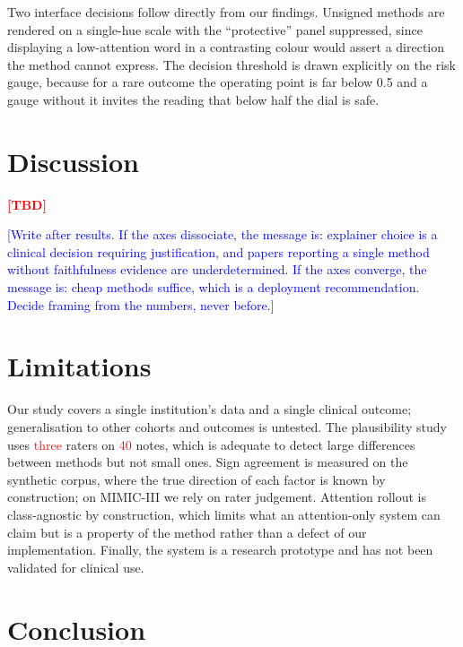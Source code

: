 \documentclass[conference]{IEEEtran}
\newif\ifdraftnums\draftnumstrue   %
\newcommand{\TBD}{\ifdraftnums\textcolor{red}{\textbf{[TBD]}}\else--\fi}
\newcommand{\ph}[1]{\ifdraftnums\textcolor{red}{#1}\else#1\fi}
\newcommand{\note}[1]{\ifdraftnums\textcolor{blue}{\small[#1]}\fi}
\begin{document}
Two interface decisions follow directly from our findings. Unsigned methods are
rendered on a single-hue scale with the ``protective'' panel suppressed, since
displaying a low-attention word in a contrasting colour would assert a direction
the method cannot express. The decision threshold is drawn explicitly on the risk
gauge, because for a rare outcome the operating point is far below 0.5 and a
gauge without it invites the reading that below half the dial is safe.

\section{Discussion}

\TBD

\note{Write after results. If the axes dissociate, the message is: explainer
choice is a clinical decision requiring justification, and papers reporting a
single method without faithfulness evidence are underdetermined. If the axes
converge, the message is: cheap methods suffice, which is a deployment
recommendation. Decide framing from the numbers, never before.}

\section{Limitations}

Our study covers a single institution's data and a single clinical outcome;
generalisation to other cohorts and outcomes is untested. The plausibility study
uses \ph{three} raters on \ph{40} notes, which is adequate to detect large
differences between methods but not small ones. Sign agreement is measured on the
synthetic corpus, where the true direction of each factor is known by
construction; on MIMIC-III we rely on rater judgement. Attention rollout is
class-agnostic by construction, which limits what an attention-only system can
claim but is a property of the method rather than a defect of our
implementation. Finally, the system is a research prototype and has not been
validated for clinical use.

\section{Conclusion}
\end{document}
